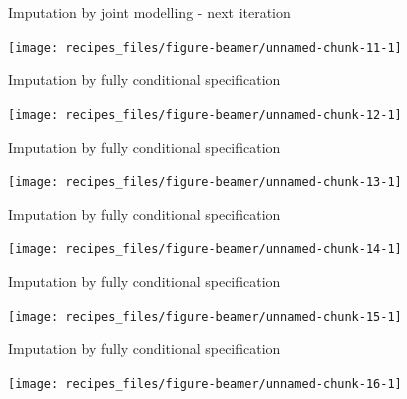 \documentclass[ignorenonframetext,aspectratio=43]{beamer}
\begin{document}
\begin{frame}{Imputation by joint modelling - next iteration}

\begin{center}\texttt{[image: recipes\_files/figure-beamer/unnamed-chunk-11-1]} \end{center}

\end{frame}

\begin{frame}{Imputation by fully conditional specification}

\begin{center}\texttt{[image: recipes\_files/figure-beamer/unnamed-chunk-12-1]} \end{center}

\end{frame}

\begin{frame}{Imputation by fully conditional specification}

\begin{center}\texttt{[image: recipes\_files/figure-beamer/unnamed-chunk-13-1]} \end{center}

\end{frame}

\begin{frame}{Imputation by fully conditional specification}

\begin{center}\texttt{[image: recipes\_files/figure-beamer/unnamed-chunk-14-1]} \end{center}

\end{frame}

\begin{frame}{Imputation by fully conditional specification}

\begin{center}\texttt{[image: recipes\_files/figure-beamer/unnamed-chunk-15-1]} \end{center}

\end{frame}

\begin{frame}{Imputation by fully conditional specification}

\begin{center}\texttt{[image: recipes\_files/figure-beamer/unnamed-chunk-16-1]} \end{center}

\end{frame}
\end{document}
